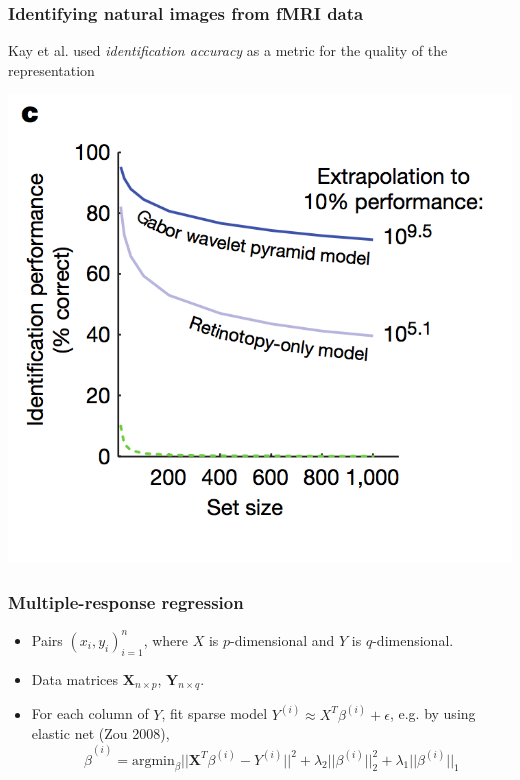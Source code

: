 \documentclass{beamer}
\newcommand{\bX}{\boldsymbol{X}}
\newcommand{\bY}{\boldsymbol{Y}}
\begin{document}
\begin{frame}
\frametitle{Identifying natural images from fMRI data}
Kay et al. used \emph{identification accuracy} as a metric for the quality of the representation
\begin{center}
\includegraphics[scale = 0.25]{kay_extrapolation.png}
\end{center}
\end{frame}

\begin{frame}
\frametitle{Multiple-response regression}
\begin{itemize}
\item Pairs $(x_i,y_i)_{i=1}^n$, where $X$ is $p$-dimensional and $Y$ is $q$-dimensional.
\item Data matrices $\bX_{n \times p}$, $\bY_{n \times q}$.
\item For each column of $Y$, fit sparse model $Y^{(i)} \approx X^T \beta^{(i)}  + \epsilon$, e.g. by using elastic net (Zou 2008), 
\[
\hat{\beta}^{(i)} = \text{argmin}_\beta ||\bX^T \beta^{(i)} - Y^{(i)}||^2 + \lambda_2 ||\beta^{(i)}||_2^2 + \lambda_1 ||\beta^{(i)}||_1
\]
\end{itemize}
\end{frame}
\end{document}
